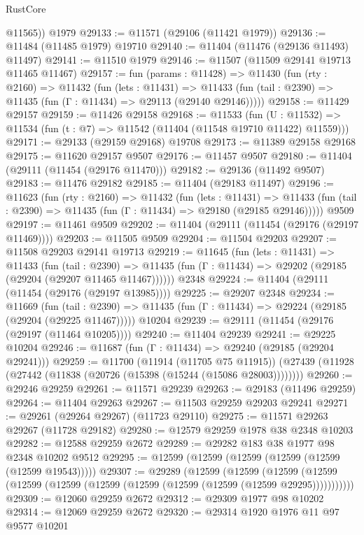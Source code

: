 \begin{lexlean}{RustCore}
\begin{coremodule}
        @11565))
    @1979
@29133 := @11571 (@29106 (@11421 @1979))
@29136 := @11484 (@11485 @1979) @19710
@29140 := @11404 (@11476 (@29136 @11493) @11497)
@29141 := @11510 @1979
@29146 := @11507 (@11509 @29141 @19713 @11465 @11467)
@29157 := fun (params : @11428) =>
  @11430
    (fun (rty : @2160) =>
    @11432
      (fun (lets : @11431) =>
      @11433 (fun (tail : @2390) => @11435 (fun (Γ : @11434) => @29113 (@29140 @29146)))))
@29158 := @11429 @29157
@29159 := @11426 @29158
@29168 := @11533
    (fun (U : @11532) => @11534 (fun (t : @7) => @11542 (@11404 (@11548 @19710 @11422) @11559)))
@29171 := @29133 (@29159 @29168) @19708
@29173 := @11389 @29158 @29168
@29175 := @11620 @29157 @9507
@29176 := @11457 @9507
@29180 := @11404 (@29111 (@11454 (@29176 @11470)))
@29182 := @29136 (@11492 @9507)
@29183 := @11476 @29182
@29185 := @11404 (@29183 @11497)
@29196 := @11623
    (fun (rty : @2160) =>
    @11432
      (fun (lets : @11431) =>
      @11433 (fun (tail : @2390) => @11435 (fun (Γ : @11434) => @29180 (@29185 @29146)))))
    @9509
@29197 := @11461 @9509
@29202 := @11404 (@29111 (@11454 (@29176 (@29197 @11469))))
@29203 := @11505 @9509
@29204 := @11504 @29203
@29207 := @11508 @29203 @29141 @19713
@29219 := @11645
    (fun (lets : @11431) =>
    @11433
      (fun (tail : @2390) =>
      @11435 (fun (Γ : @11434) => @29202 (@29185 (@29204 (@29207 @11465 @11467))))))
    @2348
@29224 := @11404 (@29111 (@11454 (@29176 (@29197 @13985))))
@29225 := @29207 @2348
@29234 := @11669
    (fun (tail : @2390) => @11435 (fun (Γ : @11434) => @29224 (@29185 (@29204 (@29225 @11467)))))
    @10204
@29239 := @29111 (@11454 (@29176 (@29197 (@11464 @10205))))
@29240 := @11404 @29239
@29241 := @29225 @10204
@29246 := @11687 (fun (Γ : @11434) => @29240 (@29185 (@29204 @29241)))
@29259 := @11700
    (@11914 (@11705 @75 @11915))
    (@27439 (@11928 (@27442 (@11838 (@20726 (@15398 (@15244 (@15086 @28003))))))))
@29260 := @29246 @29259
@29261 := @11571 @29239
@29263 := @29183 (@11496 @29259)
@29264 := @11404 @29263
@29267 := @11503 @29259 @29203 @29241
@29271 := @29261 (@29264 @29267) (@11723 @29110)
@29275 := @11571 @29263 @29267 (@11728 @29182)
@29280 := @12579 @29259 @1978 @38 @2348 @10203
@29282 := @12588 @29259 @2672
@29289 := @29282 @183 @38 @1977 @98 @2348 @10202 @9512
@29295 := @12599 (@12599 (@12599 (@12599 (@12599 (@12599 @19543)))))
@29307 := @29289
    (@12599
      (@12599
        (@12599 (@12599 (@12599 (@12599 (@12599 (@12599 (@12599 (@12599 (@12599 @29295)))))))))))
@29309 := @12060 @29259 @2672
@29312 := @29309 @1977 @98 @10202
@29314 := @12069 @29259 @2672
@29320 := @29314 @1920 @1976 @11 @97 @9577 @10201

\end{coremodule}
\end{lexlean}
